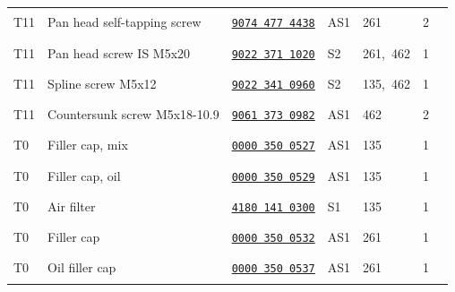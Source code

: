 \documentclass[10pt,letterpaper]{article}
\begin{document}
\begin{longtable}{@{}l>{\raggedright\arraybackslash}p{2.58in}p{1.23in}llrr@{}}
\rowcolor{black!6}T11 & Pan head self-tapping screw & \href{https://rduncangt.github.io/frk-management/parts/90744774438/}{\texttt{9074 477 4438}} & \textcolor{frkSupervision}{AS1} & \textcolor{frkApplication}{\mbox{261}} & 2 & \rule{0.23in}{0.3pt}\\

T11 & Pan head screw IS M5x20 & \href{https://rduncangt.github.io/frk-management/parts/90223711020/}{\texttt{9022 371 1020}} & \textcolor{frkSupervision}{S2} & \textcolor{frkApplication}{\mbox{261, 462}} & 1 & \rule{0.23in}{0.3pt}\\

\rowcolor{black!6}T11 & Spline screw M5x12 & \href{https://rduncangt.github.io/frk-management/parts/90223410960/}{\texttt{9022 341 0960}} & \textcolor{frkSupervision}{S2} & \textcolor{frkApplication}{\mbox{135, 462}} & 1 & \rule{0.23in}{0.3pt}\\

T11 & Countersunk screw M5x18-10.9 & \href{https://rduncangt.github.io/frk-management/parts/90613730982/}{\texttt{9061 373 0982}} & \textcolor{frkSupervision}{AS1} & \textcolor{frkApplication}{\mbox{462}} & 2 & \rule{0.23in}{0.3pt}\\

\rowcolor{black!6}T0 & Filler cap, mix & \href{https://rduncangt.github.io/frk-management/parts/00003500527/}{\texttt{0000 350 0527}} & \textcolor{frkSupervision}{AS1} & \textcolor{frkApplication}{\mbox{135}} & 1 & \rule{0.23in}{0.3pt}\\

T0 & Filler cap, oil & \href{https://rduncangt.github.io/frk-management/parts/00003500529/}{\texttt{0000 350 0529}} & \textcolor{frkSupervision}{AS1} & \textcolor{frkApplication}{\mbox{135}} & 1 & \rule{0.23in}{0.3pt}\\

\rowcolor{black!6}T0 & Air filter & \href{https://rduncangt.github.io/frk-management/parts/41801410300/}{\texttt{4180 141 0300}} & \textcolor{frkSupervision}{S1} & \textcolor{frkApplication}{\mbox{135}} & 1 & \rule{0.23in}{0.3pt}\\

T0 & Filler cap & \href{https://rduncangt.github.io/frk-management/parts/00003500532/}{\texttt{0000 350 0532}} & \textcolor{frkSupervision}{AS1} & \textcolor{frkApplication}{\mbox{261}} & 1 & \rule{0.23in}{0.3pt}\\

\rowcolor{black!6}T0 & Oil filler cap & \href{https://rduncangt.github.io/frk-management/parts/00003500537/}{\texttt{0000 350 0537}} & \textcolor{frkSupervision}{AS1} & \textcolor{frkApplication}{\mbox{261}} & 1 & \rule{0.23in}{0.3pt}\\


\end{longtable}
\end{document}
